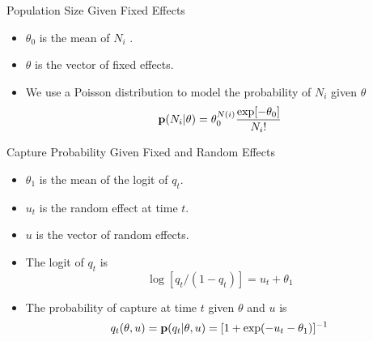 \documentclass{beamer}
\newcommand{\B}[1]{{\bf #1}}
\begin{document}
\begin{frame}{Population Size Given Fixed Effects}
\begin{itemize}

\item
$\theta_0$ is the mean of $N_i$ .
\pause

\item
$\theta$ is the vector of fixed effects.
\pause

\item
We use a Poisson distribution to model the probability of $N_i$
given $\theta$
\[
\B{p} ( N_i | \theta  )
=
\theta_0^{N(i)} \frac{ \exp[ - \theta_0 ] }{ N_i ! }
\]

\end{itemize}
\end{frame}

\begin{frame}{Capture Probability Given Fixed and Random Effects}
\begin{itemize}

\item
$\theta_1$ is the mean of the logit of $q_t$.
\pause

\item
$u_t$ is the random effect at time $t$.
\pause

\item
$u$ is the vector of random effects.
\pause

\item
The logit of $q_t$ is
\[
	\log [ q_t / ( 1 - q_t ) ] = u_t + \theta_1
\]
\pause

\item
The probability of capture at time $t$ given $\theta$ and $u$ is
\[
	q_t ( \theta , u )
	=
	\B{p} ( q_t | \theta , u )
	=
	[ 1 + \exp( - u_t - \theta_1 ) ]^{-1}
\]


\end{itemize}
\end{frame}
\end{document}
